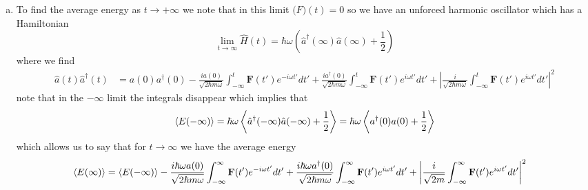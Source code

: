 \documentclass[11pt]{article}
\numberwithin{equation}{section}
\begin{document}
\begin{enumerate}[(a)]
\item To find the average energy as $t\rightarrow+\infty$ we note that in this limit 
$\mathbf(F)(t)=0$ so we have an unforced harmonic oscillator which has a Hamiltonian 
$$\lim_{t\rightarrow\infty}\hat{H}(t) = \hbar{\omega}\left(\hat{a}^{\dagger}(\infty)\hat{a}(\infty)+\frac{1}{2}\right)$$
where we find
\begin{align*}
\hat{a}(t)\hat{a}^{\dagger}(t) &= a(0)a^{\dagger}(0) - \frac{ia(0)}{\sqrt{2\hbar{m}\omega}}\int_{-\infty}^{t}\mathbf{F}(t')e^{-i\omega{t'}}dt' + \frac{ia^{\dagger}(0)}{\sqrt{2\hbar{m}\omega}}\int_{-\infty}^{t}\mathbf{F}(t')e^{i\omega{t'}}dt' + \left|\frac{i}{\sqrt{2\hbar{m}\omega}}\int_{-\infty}^{t}\mathbf{F}(t')e^{i\omega{t'}}dt'\right|^2
\end{align*}
note that in the $-\infty$ limit the integrals disappear which implies that
$$\left\langle{E(-\infty)}\right\rangle = \hbar\omega\left\langle{\hat{a}^{\dagger}(-\infty)\hat{a}(-\infty)+\frac{1}{2}}\right\rangle = \hbar\omega\left\langle{a^{\dagger}(0)a(0)+\frac{1}{2}}\right\rangle$$
which allows us to say that for $t\rightarrow\infty$ we have the average energy
\begin{align*}
\left\langle{E(\infty)}\right\rangle &= \left\langle{E(-\infty)}\right\rangle - \frac{i\hbar{\omega}a(0)}{\sqrt{2\hbar{m}\omega}}\int_{-\infty}^{\infty}\mathbf{F}(t')e^{-i\omega{t'}}dt' + \frac{i\hbar{\omega}a^{\dagger}(0)}{\sqrt{2\hbar{m}\omega}}\int_{-\infty}^{\infty}\mathbf{F}(t')e^{i\omega{t'}}dt' + \left|\frac{i}{\sqrt{2m}}\int_{-\infty}^{\infty}\mathbf{F}(t')e^{i\omega{t'}}dt'\right|^2
\end{align*}


\end{enumerate}
\end{document}
